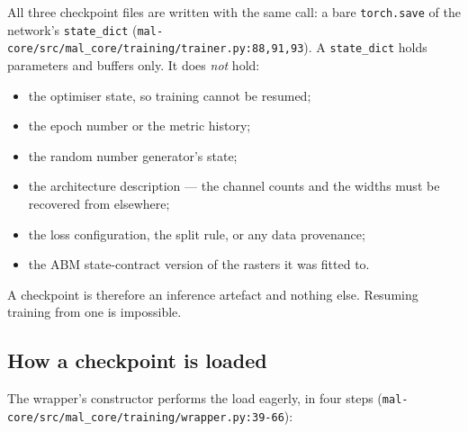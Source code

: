 \documentclass[11pt,a4paper]{article}
\newcommand{\codex}[1]{\texttt{#1}}
\begin{document}
All three checkpoint files are written with the same call: a bare
\codex{torch.save} of the network's \codex{state\_\allowbreak{}dict}
(\codex{mal-core/\allowbreak{}src/\allowbreak{}mal\_\allowbreak{}core/\allowbreak{}training/\allowbreak{}trainer.py:88,91,93}). A
\codex{state\_\allowbreak{}dict} holds parameters and buffers only. It does \emph{not} hold:

\begin{itemize}
\item the optimiser state, so training cannot be resumed;
\item the epoch number or the metric history;
\item the random number generator's state;
\item the architecture description --- the channel counts and the widths must
      be recovered from elsewhere;
\item the loss configuration, the split rule, or any data provenance;
\item the ABM state-contract version of the rasters it was fitted to.
\end{itemize}

A checkpoint is therefore an inference artefact and nothing else. Resuming
training from one is impossible.

\subsection{How a checkpoint is loaded}

The wrapper's constructor performs the load eagerly, in four steps
(\codex{mal-core/\allowbreak{}src/\allowbreak{}mal\_\allowbreak{}core/\allowbreak{}training/\allowbreak{}wrapper.py:39-66}):
\end{document}
